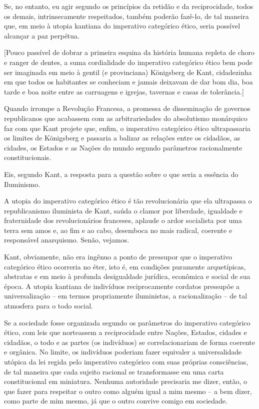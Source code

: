 Se, no entanto, eu agir segundo os princípios da retidão e da
reciprocidade, todos os demais, intrinsecamente respeitados, também
poderão fazê-lo, de tal maneira que, em meio à utopia kantiana do
imperativo categórico ético, seria possível alcançar a paz perpétua.

{[}Pouco passível de dobrar a primeira esquina da história humana
repleta de choro e ranger de dentes, a suma cordialidade do imperativo
categórico ético bem pode ser imaginada em meio à gentil (e provinciana)
Königsberg de Kant, cidadezinha em que todos os habitantes se conheciam
e jamais deixavam de dar bom dia, boa tarde e boa noite entre as
carruagens e igrejas, tavernas e casas de tolerância.{]}

Quando irrompe a Revolução Francesa, a promessa de disseminação de
governos republicanos que acabassem com as arbitrariedades do
absolutismo monárquico faz com que Kant projete que, enfim, o imperativo
categórico ético ultrapassaria os limites de Königsberg e passaria a
balizar as relações entre os cidadãos, as cidades, os Estados e as
Nações do mundo segundo parâmetros racionalmente constitucionais.

Eis, segundo Kant, a resposta para a questão sobre o que seria a
essência do Iluminismo.

A utopia do imperativo categórico ético é tão revolucionária que ela
ultrapassa o republicanismo iluminista de Kant, saúda o clamor por
liberdade, igualdade e fraternidade dos revolucionários franceses,
aplaude o ardor socialista por uma terra sem amos e, ao fim e ao cabo,
desemboca no mais radical, coerente e responsável anarquismo. Senão,
vejamos.

Kant, obviamente, não era ingênuo a ponto de pressupor que o imperativo
categórico ético ocorreria no éter, isto é, em condições puramente
arquetípicas, abstratas e em meio à profunda desigualdade jurídica,
econômica e social de sua época. A utopia kantiana de indivíduos
reciprocamente cordatos pressupõe a universalização -- em termos
propriamente iluministas, a racionalização -- de tal atmosfera para o
todo social.

Se a sociedade fosse organizada segundo os parâmetros do imperativo
categórico ético, com leis que norteassem a reciprocidade entre Nações,
Estados, cidades e cidadãos, o todo e as partes (os indivíduos) se
correlacionariam de forma coerente e orgânica. No limite, os indivíduos
poderiam fazer equivaler a universalidade utópica da lei regida pelo
imperativo categórico com suas próprias consciências, de tal maneira que
cada sujeito racional se transformasse em uma carta constitucional em
miniatura. Nenhuma autoridade precisaria me dizer, então, o que fazer
para respeitar o outro como alguém igual a mim mesmo -- a bem dizer,
como parte de mim mesmo, já que o outro convive comigo em sociedade.

